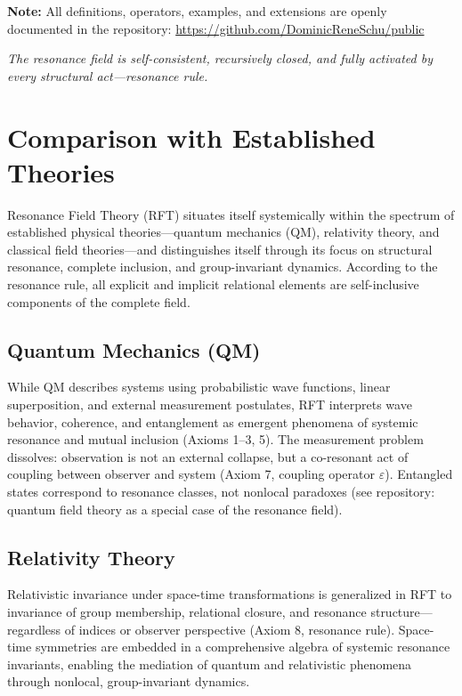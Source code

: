 \documentclass[12pt]{iopart}
\begin{document}
\medskip

\noindent\textbf{Note:}  
All definitions, operators, examples, and extensions are openly documented in the repository:  
\url{https://github.com/DominicReneSchu/public}

\medskip

\noindent\textit{The resonance field is self-consistent, recursively closed, and fully activated by every structural act—resonance rule.}
	
\section{Comparison with Established Theories}

Resonance Field Theory (RFT) situates itself systemically within the spectrum of established physical theories—quantum mechanics (QM), relativity theory, and classical field theories—and distinguishes itself through its focus on structural resonance, complete inclusion, and group-invariant dynamics. According to the resonance rule, all explicit and implicit relational elements are self-inclusive components of the complete field.

\subsection{Quantum Mechanics (QM)}

While QM describes systems using probabilistic wave functions, linear superposition, and external measurement postulates, RFT interprets wave behavior, coherence, and entanglement as emergent phenomena of systemic resonance and mutual inclusion (Axioms 1–3, 5). The measurement problem dissolves: observation is not an external collapse, but a co-resonant act of coupling between observer and system (Axiom 7, coupling operator $\varepsilon$). Entangled states correspond to resonance classes, not nonlocal paradoxes (see repository: quantum field theory as a special case of the resonance field).

\subsection{Relativity Theory}

Relativistic invariance under space-time transformations is generalized in RFT to invariance of group membership, relational closure, and resonance structure—regardless of indices or observer perspective (Axiom 8, resonance rule). Space-time symmetries are embedded in a comprehensive algebra of systemic resonance invariants, enabling the mediation of quantum and relativistic phenomena through nonlocal, group-invariant dynamics.
\end{document}
